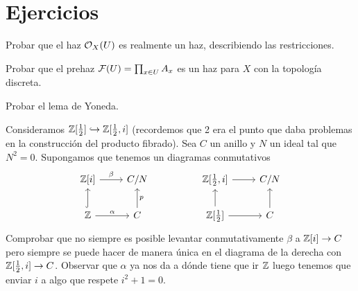 \documentclass[GA.tex]{subfiles}
\begin{document}
\section{Ejercicios}
\begin{ejer}
Probar que el haz ${\mathcal O}_X(U)$ es realmente un haz, describiendo las restricciones. 
\end{ejer}
\begin{ejer}
Probar que el prehaz $\mathcal{F}(U)=\prod_{x\in U} A_x$ es un haz para $X$ con la topología discreta. 
\end{ejer}
\begin{ejer}
Probar el lema de Yoneda. 
\end{ejer}
\begin{ejer}
Consideramos $\mathbb{Z}[\frac{1}{2}]\hookrightarrow\mathbb{Z}[\frac{1}{2},i]$ (recordemos que 2 era el punto que daba problemas en la construcción del producto fibrado). Sea $C$ un anillo y $N$ un ideal tal que $N^2=0$. Supongamos que tenemos un diagramas conmutativos
\[
\begin{tikzcd}
\Z[i]\arrow[r, "\beta"] & C/N & & \Z[\frac{1}{2},i]\arrow[r] & C/N\\
\Z\arrow[u, hookrightarrow]\arrow[r, "\alpha"] & C\arrow[u, "p"'] & & \Z[\frac{1}{2}]\arrow[u]\arrow[r] & C\arrow[u]
\end{tikzcd}
\]
Comprobar que no siempre es posible levantar conmutativamente $\beta$ a $\mathbb{Z}[i]\to C$ pero siempre se puede hacer de manera única en el diagrama de la derecha con $\mathbb{Z}[\frac{1}{2},i]\to C$. Observar que $\alpha$ ya nos da a dónde tiene que ir $\mathbb{Z}$ luego tenemos que enviar $i$ a algo que respete $i^2+1=0$. 
\end{ejer}
\end{document}
